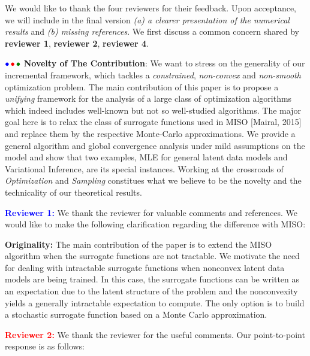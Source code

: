 \documentclass{article}
\begin{document}
We would like to thank the four reviewers for their feedback. Upon acceptance, we will include in the final version \emph{{\sf (a)} a clearer presentation of the numerical results} and \emph{{\sf (b)} missing references}. 
We first discuss a common concern shared by \textbf{\color{blue}reviewer 1}, \textbf{\color{red} reviewer 2}, \textbf{\color{green!50!black}reviewer 4}.

${\color{blue}\bullet}\!~{\color{red}\bullet}\!~{\color{green!50!black}\bullet}$ \textbf{Novelty of The Contribution}: 
We want to stress on the generality of our incremental framework, which tackles a \emph{constrained}, \emph{non-convex} and \emph{non-smooth} optimization problem. 
The main contribution of this paper is to propose a \emph{unifying} framework for the analysis of a large class of optimization algorithms which indeed includes well-known but not so well-studied algorithms.
The major goal here is to relax the class of surrogate functions used in MISO [Mairal, 2015] and replace them by the respective Monte-Carlo approximations.
We provide a general algorithm and global convergence analysis under mild assumptions on the model and show that two examples, MLE for general latent data models and Variational Inference, are its special instances.
Working at the crossroads of \emph{Optimization} and \emph{Sampling} constitues what we believe to be the novelty and the technicality of our theoretical results.\vspace{-0.05in}


\textbf{\textcolor{blue}{Reviewer 1:}} We thank the reviewer for valuable comments and references. We would like to make the following clarification regarding the difference with MISO:

\textbf{Originality:} The main contribution of the paper is to extend the MISO algorithm when the surrogate functions are not tractable. 
We motivate the need for dealing with intractable surrogate functions when nonconvex latent data models are being trained. 
In this case, the surrogate functions can be written as an expectation due to the latent structure of the problem and the nonconvexity yields a generally intractable expectation to compute. 
The only option is to build a stochastic surrogate function based on a Monte Carlo approximation.\vspace{-0.05in}


\textbf{\textcolor{red}{Reviewer 2:}} We thank the reviewer for the useful comments. Our point-to-point response is as follows:
\end{document}
